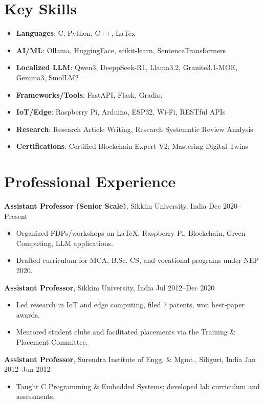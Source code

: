 \documentclass[10pt,a4paper]{article}
\begin{document}
	\section*{Key Skills}
	\begin{itemize}
		\item \textbf{Languages}: C, Python, C++, LaTex
		\item \textbf{AI/ML}: Ollama, HuggingFace, scikit-learn, SentenceTransformers
		\item \textbf{Localized LLM}: Qwen3, DeeppSeek-R1, Llama3.2, Granite3.1-MOE, Gemma3, SmolLM2
		\item \textbf{Frameworks/Tools}: FastAPI, Flask, Gradio, 
		\item \textbf{IoT/Edge}: Raspberry Pi, Arduino, ESP32, Wi‑Fi, RESTful APIs
		\item \textbf{Research}: Research Article Writing, Research Systematic Review Analysis
		\item \textbf{Certifications}: Certified Blockchain Expert-V2; Mastering Digital Twins
	\end{itemize}
	
	\section*{Professional Experience}
	\textbf{Assistant Professor (Senior Scale)}, Sikkim University, India \hfill Dec 2020--Present
	\begin{itemize}
		\item Organized FDPs/workshops on LaTeX, Raspberry Pi, Blockchain, Green Computing, LLM applications.
		\item Drafted curriculum for MCA, B.Sc. CS, and vocational programs under NEP 2020.
	\end{itemize}
	
	\textbf{Assistant Professor}, Sikkim University, India \hfill Jul 2012--Dec 2020
	\begin{itemize}
		\item Led research in IoT and edge computing, filed 7 patents, won best‑paper awards.
		\item Mentored student clubs and facilitated placements via the Training \& Placement Committee.
	\end{itemize}
	
	\textbf{Assistant Professor}, Surendra Institute of Engg. \& Mgmt., Siliguri, India \hfill Jan 2012--Jun 2012
	\begin{itemize}
		\item Taught C Programming \& Embedded Systems; developed lab curriculum and assessments.
	\end{itemize}
	
\end{document}
